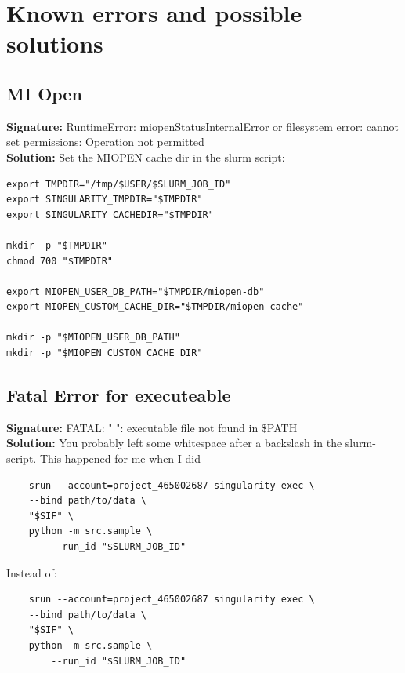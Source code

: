 \section*{Known errors and possible solutions}

\subsection*{MI Open}
\textbf{Signature: } RuntimeError: miopenStatusInternalError or filesystem error: cannot set permissions: Operation not permitted\\
\textbf{Solution: } Set the MIOPEN cache dir in the slurm script:
\begin{lstlisting}
export TMPDIR="/tmp/$USER/$SLURM_JOB_ID"
export SINGULARITY_TMPDIR="$TMPDIR"
export SINGULARITY_CACHEDIR="$TMPDIR"

mkdir -p "$TMPDIR"
chmod 700 "$TMPDIR"

export MIOPEN_USER_DB_PATH="$TMPDIR/miopen-db"
export MIOPEN_CUSTOM_CACHE_DIR="$TMPDIR/miopen-cache"

mkdir -p "$MIOPEN_USER_DB_PATH"
mkdir -p "$MIOPEN_CUSTOM_CACHE_DIR"
\end{lstlisting}

\subsection*{Fatal Error for executeable}
\textbf{Signature: } FATAL:   " ": executable file not found in \$PATH \\
\textbf{Solution: } You probably left some whitespace after a backslash in the slurm-script. This happened for me when I did
\begin{lstlisting}
    srun --account=project_465002687 singularity exec \
    --bind path/to/data \
    "$SIF" \
    python -m src.sample \  
        --run_id "$SLURM_JOB_ID"
\end{lstlisting}
Instead of:
\begin{lstlisting}
    srun --account=project_465002687 singularity exec \
    --bind path/to/data \
    "$SIF" \
    python -m src.sample \
        --run_id "$SLURM_JOB_ID"
\end{lstlisting}